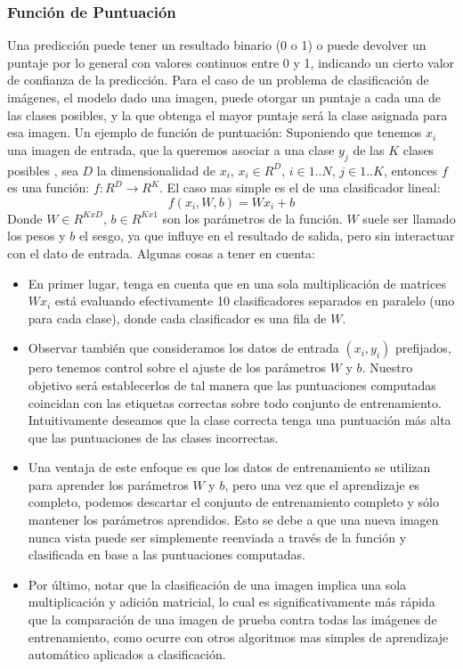 \documentclass[a4paper,11pt,spanish]{book}
\begin{document}
	\subsubsection{Función de Puntuación}
	  Una predicción puede tener un resultado binario (0 o 1) o puede devolver un puntaje por lo general con valores continuos entre 0 y 1, indicando un cierto valor de confianza 
	  de la predicción. Para el caso de un problema de clasificación de imágenes, el modelo dado una imagen, puede otorgar un puntaje a cada una de las clases posibles, 
	  y la que obtenga el mayor puntaje será la clase asignada para esa imagen.
	  Un ejemplo de función de puntuación:
	  Suponiendo que tenemos $x_{i}$  una imagen de entrada, que la queremos asociar a una clase $y_{j}$ de las $K$ clases posibles , sea $D$ la dimensionalidad de $x_{i}$, $x_{i} \in R^D$,
	  $i \in 1..N$, $j \in 1..K$, entonces $f$ es una función: $f:R^D {\rightarrow} R^K$. El caso mas simple es el de una clasificador lineal:\\
	  \begin{equation*}
	    f(x_{i}, W, b) = W x_{i} + b
	  \end{equation*}
	  Donde $W \in R^{KxD}$, $b \in R^{Kx1}$ son los parámetros de la función. $W$ suele ser llamado los pesos y $b$ el sesgo, ya que influye en el resultado de salida, pero sin 
	  interactuar con el dato de entrada.
	  Algunas cosas a tener en cuenta:
	  \begin{itemize}
	   \item En primer lugar, tenga en cuenta que en una sola multiplicación de matrices $Wx_{i}$ está evaluando efectivamente 10 clasificadores separados en paralelo (uno para cada clase), 
	      donde cada clasificador es una fila de $W$.
	   \item Observar también que consideramos los datos de entrada $(x_{i}, y_{i})$  prefijados, pero tenemos control sobre el ajuste de los parámetros $W$ y $b$. 
		 Nuestro objetivo será establecerlos de tal manera que las puntuaciones computadas coincidan con las etiquetas correctas sobre todo conjunto de entrenamiento. 
		 Intuitivamente deseamos que la clase correcta tenga una puntuación más alta que las puntuaciones de las clases incorrectas.
	   \item Una ventaja de este enfoque es que los datos de entrenamiento se utilizan para aprender los parámetros $W$ y $b$, pero una vez que el aprendizaje es completo, 
		podemos descartar el conjunto de entrenamiento completo y sólo mantener los parámetros aprendidos. Esto se debe a que una nueva imagen nunca vista puede ser 
		simplemente reenviada a través de la función y clasificada en base a las puntuaciones computadas.
	  \item Por último, notar que la clasificación de una imagen implica una sola multiplicación y adición matricial, lo cual es significativamente más rápida que la comparación 
		de una imagen de prueba contra todas las imágenes de entrenamiento, como ocurre con otros algoritmos mas simples de aprendizaje automático aplicados a clasificación.
	  \end{itemize}
\end{document}
